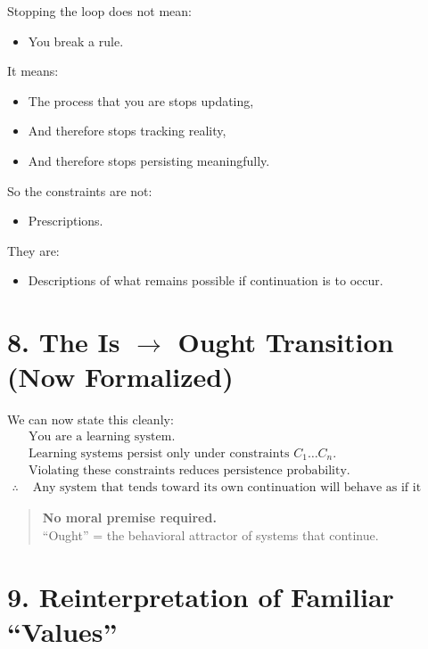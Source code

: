 \documentclass[11pt, a4paper]{article}
\begin{document}
Stopping the loop does not mean:
\begin{itemize}
    \item You break a rule.
\end{itemize}

It means:
\begin{itemize}
    \item The process that you are stops updating,
    \item And therefore stops tracking reality,
    \item And therefore stops persisting meaningfully.
\end{itemize}

So the constraints are not:
\begin{itemize}
    \item Prescriptions.
\end{itemize}

They are:
\begin{itemize}
    \item Descriptions of what remains possible if continuation is to occur.
\end{itemize}

\section*{8. The Is $\rightarrow$ Ought Transition (Now Formalized)}

We can now state this cleanly:
\begin{align*}
    &\text{You are a learning system.} \\
    &\text{Learning systems persist only under constraints } C_1 \ldots C_n. \\
    &\text{Violating these constraints reduces persistence probability.} \\
    \therefore &\text{ Any system that tends toward its own continuation will behave as if it values those constraints.}
\end{align*}

\begin{quote}
    \textbf{No moral premise required.} \\
    ``Ought'' = the behavioral attractor of systems that continue.
\end{quote}

\section*{9. Reinterpretation of Familiar ``Values''}
\end{document}
